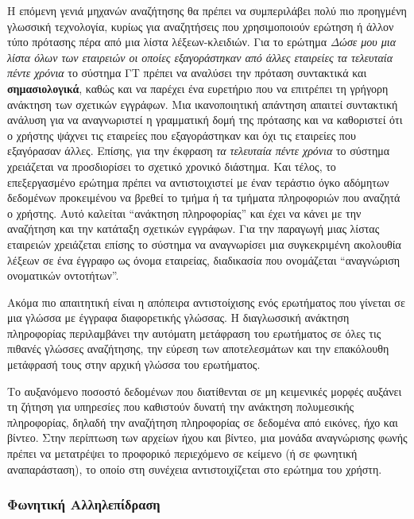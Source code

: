 \documentclass[]{../../metanetpaper}
\begin{document}
\begin{multicols}{2}
Η επόμενη γενιά μηχανών αναζήτησης θα πρέπει να συμπεριλάβει πολύ πιο προηγμένη γλωσσική τεχνολογία, κυρίως για αναζητήσεις που χρησιμοποιούν  ερώτηση ή άλλον τύπο πρότασης πέρα από μια λίστα λέξεων-κλειδιών. Για το ερώτημα \textit{Δώσε μου μια λίστα όλων των εταιρειών οι οποίες εξαγοράστηκαν από άλλες εταιρείες τα τελευταία πέντε χρόνια} το σύστημα ΓΤ πρέπει να αναλύσει την πρόταση συντακτικά και  \textbf{σημασιολογικά}, καθώς και να παρέχει ένα ευρετήριο που να επιτρέπει τη γρήγορη ανάκτηση των σχετικών εγγράφων. Μια ικανοποιητική απάντηση απαιτεί συντακτική ανάλυση για να αναγνωριστεί η γραμματική δομή της πρότασης και να καθοριστεί ότι ο χρήστης ψάχνει τις εταιρείες που εξαγοράστηκαν και όχι τις εταιρείες που εξαγόρασαν άλλες. Επίσης, για την έκφραση \textit{τα τελευταία πέντε χρόνια} το σύστημα χρειάζεται να προσδιορίσει το σχετικό χρονικό διάστημα. Και τέλος, το επεξεργασμένο ερώτημα πρέπει να αντιστοιχιστεί με έναν τεράστιο όγκο αδόμητων δεδομένων προκειμένου να βρεθεί το τμήμα ή τα τμήματα πληροφοριών που αναζητά ο χρήστης. Αυτό καλείται ``ανάκτηση πληροφορίας'' και έχει να κάνει με την αναζήτηση και την κατάταξη σχετικών εγγράφων. Για την παραγωγή μιας λίστας εταιρειών χρειάζεται επίσης το σύστημα να αναγνωρίσει  μια συγκεκριμένη ακολουθία λέξεων σε ένα έγγραφο ως όνομα εταιρείας,  διαδικασία που ονομάζεται ``αναγνώριση ονοματικών οντοτήτων''.


Ακόμα πιο απαιτητική είναι η απόπειρα αντιστοίχισης ενός ερωτήματος που γίνεται σε μια γλώσσα με έγγραφα διαφορετικής γλώσσας. Η διαγλωσσική ανάκτηση πληροφορίας περιλαμβάνει την αυτόματη μετάφραση του ερωτήματος σε όλες τις πιθανές γλώσσες αναζήτησης, την εύρεση των αποτελεσμάτων και  την επακόλουθη μετάφρασή τους  στην αρχική γλώσσα του ερωτήματος.

Το αυξανόμενο ποσοστό δεδομένων που διατίθενται σε μη κειμενικές μορφές αυξάνει τη ζήτηση για υπηρεσίες που καθιστούν δυνατή την ανάκτηση πολυμεσικής πληροφορίας, δηλαδή την αναζήτηση πληροφορίας σε δεδομένα από εικόνες, ήχο και βίντεο. Στην περίπτωση των αρχείων ήχου και βίντεο, μια μονάδα αναγνώρισης φωνής πρέπει να μετατρέψει το προφορικό περιεχόμενο σε κείμενο (ή σε φωνητική αναπαράσταση), το οποίο στη συνέχεια αντιστοιχίζεται στο ερώτημα του χρήστη.

\subsubsection{Φωνητική Αλληλεπίδραση}


\end{multicols}
\end{document}
